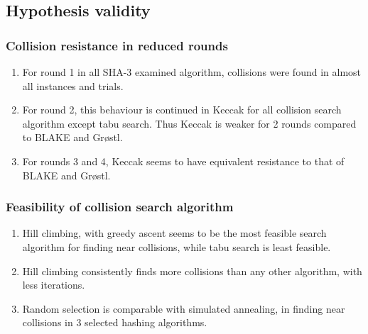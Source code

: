 \documentclass{beamer}
\begin{document}
\subsection{Hypothesis validity}


\begin{frame}
\frametitle{Collision resistance in reduced rounds}
\begin{enumerate}
\item For round 1 in all SHA-3 examined algorithm, collisions were found in almost all instances and
trials.
\item For round 2, this behaviour is continued in Keccak for all collision search algorithm except tabu
search. Thus Keccak is weaker for 2 rounds compared to BLAKE and Gr{\o}stl.
\item For rounds 3 and 4, Keccak seems to have equivalent resistance to that of BLAKE and Gr{\o}stl.
\end{enumerate}
\end{frame}

\begin{frame}
\frametitle{Feasibility of collision search algorithm}
\begin{enumerate}
\item Hill climbing, with greedy ascent seems to be the most feasible search algorithm for finding near
collisions, while tabu search is least feasible.
\item Hill climbing consistently finds more collisions than any other algorithm, with less iterations.
\item Random selection is comparable with simulated annealing, in finding near collisions in 3 selected
hashing algorithms.
\end{enumerate}
\end{frame}
\end{document}
